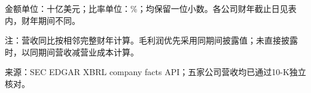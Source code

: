 \label{tab:peer-comparison}
{\scriptsize 金额单位：十亿美元；比率单位：\%；均保留一位小数。各公司财年截止日见表内，财年期间不同。\par}
{\footnotesize\setlength{\tabcolsep}{5pt}\par}
{\scriptsize 注：营收同比按相邻完整财年计算。毛利润优先采用同期间披露值；未直接披露时，以同期间营收减营业成本计算。\par}
{\scriptsize 来源：SEC EDGAR XBRL company facts API；五家公司营收均已通过10-K独立核对。\par}

